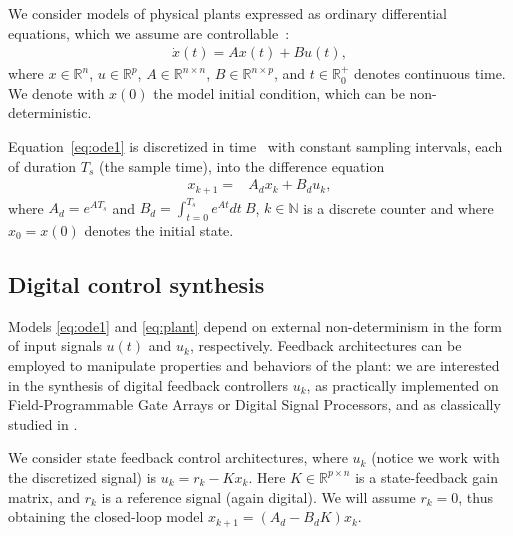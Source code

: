 \documentclass[twocolumn]{autart}    %
\newcommand{\mat}[1]{{#1}}
\renewcommand{\vec}[1]{{#1}}
\begin{document}
We consider models of physical plants expressed as ordinary differential
equations, which we assume are controllable~\cite{Astrom08}: 
%
\begin{align}
\label{eq:ode1}
\dot{x}(t) = \mat{A}\vec{x}(t)+ \mat{B} \vec{u}(t), 
\end{align}
%
where 
$\vec{x} \in \mathbb{R}^n$,  
$\vec{u} \in \mathbb{R}^p$, 
$\mat{A} \in \mathbb{R}^{n \times n}$, 
$\mat{B} \in \mathbb{R}^{n \times p}$,
and $t \in \mathbb R_0^+$ denotes continuous time. 
We denote with $x(0)$ the model initial condition, which can be non-deterministic. 

Equation~\eqref{eq:ode1} is 
discretized in time~\cite{middleton1990digital,van1978computing} with constant sampling intervals, 
each of duration $T_s$ (the sample time), 
into the difference equation
%
\begin{align}
\label{eq:plant}
\vec{x}_{k+1} =& \mat{A}_d \vec{x}_k+ \mat{B}_d \vec{u}_k, 
\end{align} 
where 
$\mat{A}_d=e^{\mat{A}T_s}$ and 
$\mat{B}_d = \int_{t = 0}^{T_s} e^{\mat{A} t} dt\ \mat{B}$, 
$k \in \mathbb N$ is a discrete counter and where $\vec{x}_{0}=\vec{x}(0)$ denotes the initial state.  

\subsection{Digital control synthesis}

Models \eqref{eq:ode1} and \eqref{eq:plant} depend on external non-determinism in the form of input signals $u (t)$ and  $u_k$, respectively. 
Feedback architectures can be employed to manipulate properties and behaviors of the plant:    
we are interested in the synthesis of digital feedback controllers $u_k$,  
as practically implemented on Field-Programmable Gate Arrays or Digital Signal Processors,  
and as classically studied in \cite{astrom1997computer}. 

We consider state feedback control architectures, 
where $u_k$ (notice we work with the discretized signal) is $u_k = r_{k} - K x_k$. 
Here $K \in \mathbb{R}^{p \times n}$ is a state-feedback gain matrix, 
and $r_{k}$ is a reference signal (again digital). 
We will assume $r_k=0$, thus obtaining the closed-loop model 
$\vec{x}_{k+1}=(\mat{A}_d-\mat{B}_d\mat{K})\vec{x}_k$. 
\end{document}
